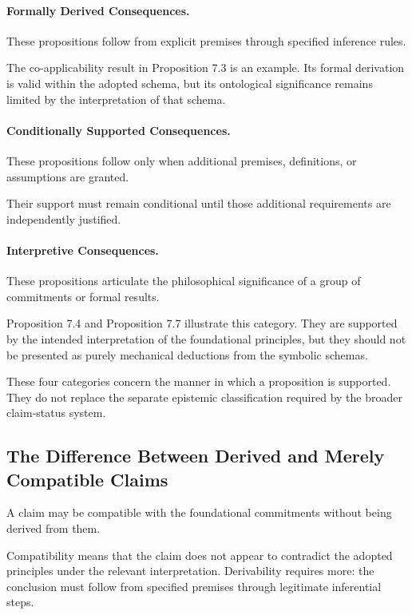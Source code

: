 \paragraph{Formally Derived Consequences.}

These propositions follow from explicit premises through
specified inference rules.

The co-applicability result in Proposition 7.3 is an example.
Its formal derivation is valid within the adopted schema,
but its ontological significance remains limited by the
interpretation of that schema.

\paragraph{Conditionally Supported Consequences.}

These propositions follow only when additional premises,
definitions, or assumptions are granted.

Their support must remain conditional until those additional
requirements are independently justified.

\paragraph{Interpretive Consequences.}

These propositions articulate the philosophical significance
of a group of commitments or formal results.

Proposition 7.4 and Proposition 7.7 illustrate this category.
They are supported by the intended interpretation of the
foundational principles, but they should not be presented
as purely mechanical deductions from the symbolic schemas.

These four categories concern the manner in which a proposition
is supported. They do not replace the separate epistemic
classification required by the broader claim-status system.

\subsection{The Difference Between Derived and Merely Compatible
Claims}

A claim may be compatible with the foundational commitments
without being derived from them.

Compatibility means that the claim does not appear to
contradict the adopted principles under the relevant
interpretation. Derivability requires more: the conclusion
must follow from specified premises through legitimate
inferential steps.

